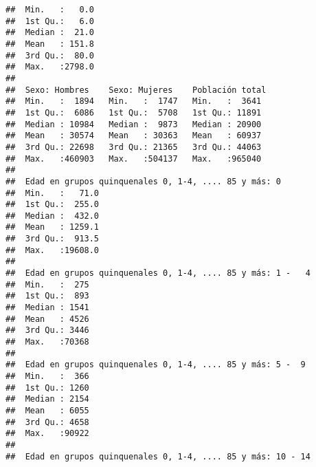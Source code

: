 \documentclass[11pt,]{article}
\begin{document}
\begin{verbatim}
##  Min.   :   0.0                                                                                 
##  1st Qu.:   6.0                                                                                 
##  Median :  21.0                                                                                 
##  Mean   : 151.8                                                                                 
##  3rd Qu.:  80.0                                                                                 
##  Max.   :2798.0                                                                                 
##                                                                                                 
##  Sexo: Hombres    Sexo: Mujeres    Población total 
##  Min.   :  1894   Min.   :  1747   Min.   :  3641  
##  1st Qu.:  6086   1st Qu.:  5708   1st Qu.: 11891  
##  Median : 10984   Median :  9873   Median : 20900  
##  Mean   : 30574   Mean   : 30363   Mean   : 60937  
##  3rd Qu.: 22698   3rd Qu.: 21365   3rd Qu.: 44063  
##  Max.   :460903   Max.   :504137   Max.   :965040  
##                                                    
##  Edad en grupos quinquenales 0, 1-4, .... 85 y más: 0
##  Min.   :   71.0                                     
##  1st Qu.:  255.0                                     
##  Median :  432.0                                     
##  Mean   : 1259.1                                     
##  3rd Qu.:  913.5                                     
##  Max.   :19608.0                                     
##                                                      
##  Edad en grupos quinquenales 0, 1-4, .... 85 y más: 1 -   4
##  Min.   :  275                                             
##  1st Qu.:  893                                             
##  Median : 1541                                             
##  Mean   : 4526                                             
##  3rd Qu.: 3446                                             
##  Max.   :70368                                             
##                                                            
##  Edad en grupos quinquenales 0, 1-4, .... 85 y más: 5 -  9
##  Min.   :  366                                            
##  1st Qu.: 1260                                            
##  Median : 2154                                            
##  Mean   : 6055                                            
##  3rd Qu.: 4658                                            
##  Max.   :90922                                            
##                                                           
##  Edad en grupos quinquenales 0, 1-4, .... 85 y más: 10 - 14

\end{verbatim}
\end{document}
